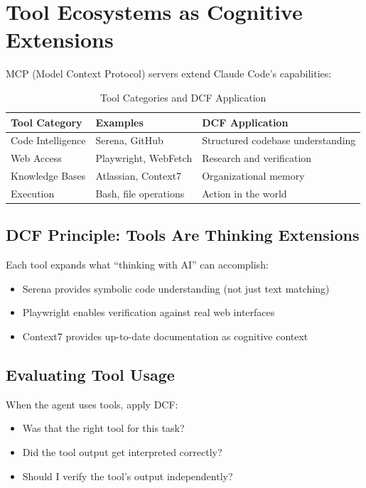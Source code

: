 \chapter{Tool Ecosystems as Cognitive Extensions}

MCP (Model Context Protocol) servers extend Claude Code's capabilities:

\begin{table}[H]
\centering
\begin{tabular}{lll}
\toprule
\textbf{Tool Category} & \textbf{Examples} & \textbf{DCF Application} \\
\midrule
Code Intelligence & Serena, GitHub & Structured codebase understanding \\
Web Access & Playwright, WebFetch & Research and verification \\
Knowledge Bases & Atlassian, Context7 & Organizational memory \\
Execution & Bash, file operations & Action in the world \\
\bottomrule
\end{tabular}
\caption{Tool Categories and DCF Application}
\end{table}

\section{DCF Principle: Tools Are Thinking Extensions}

Each tool expands what ``thinking with AI'' can accomplish:
\begin{itemize}
    \item Serena provides symbolic code understanding (not just text matching)
    \item Playwright enables verification against real web interfaces
    \item Context7 provides up-to-date documentation as cognitive context
\end{itemize}

\section{Evaluating Tool Usage}

When the agent uses tools, apply DCF:
\begin{itemize}
    \item Was that the right tool for this task?
    \item Did the tool output get interpreted correctly?
    \item Should I verify the tool's output independently?
\end{itemize}

